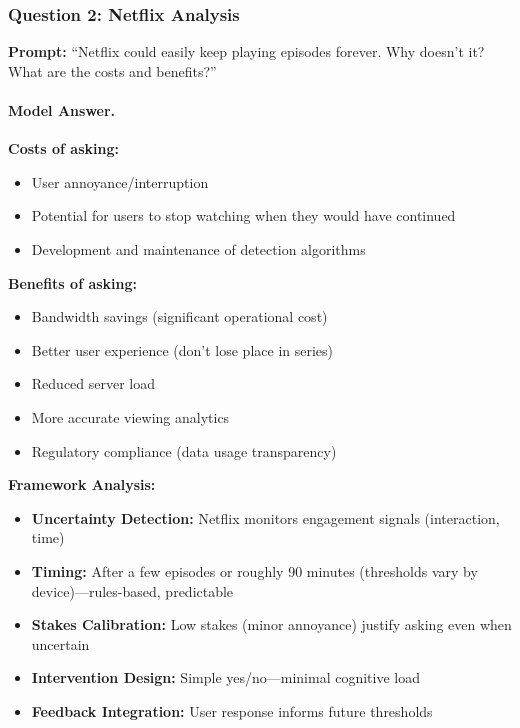 \subsubsection{Question 2: Netflix Analysis}

\textbf{Prompt:} ``Netflix could easily keep playing episodes forever. Why doesn't it? What are the costs and benefits?''

\paragraph{Model Answer.}

\textbf{Costs of asking:}
\begin{itemize}
    \item User annoyance/interruption
    \item Potential for users to stop watching when they would have continued
    \item Development and maintenance of detection algorithms
\end{itemize}

\textbf{Benefits of asking:}
\begin{itemize}
    \item Bandwidth savings (significant operational cost)
    \item Better user experience (don't lose place in series)
    \item Reduced server load
    \item More accurate viewing analytics
    \item Regulatory compliance (data usage transparency)
\end{itemize}

\textbf{Framework Analysis:}
\begin{itemize}
    \item \textbf{Uncertainty Detection:} Netflix monitors engagement signals (interaction, time)
    \item \textbf{Timing:} After a few episodes or roughly 90 minutes (thresholds vary by device)---rules-based, predictable
    \item \textbf{Stakes Calibration:} Low stakes (minor annoyance) justify asking even when uncertain
    \item \textbf{Intervention Design:} Simple yes/no---minimal cognitive load
    \item \textbf{Feedback Integration:} User response informs future thresholds
\end{itemize}

